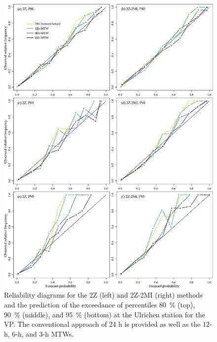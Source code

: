 \documentclass[hess, manuscript]{copernicus}
\begin{document}
	\begin{figure}[htb]
		\begin{center}
			\includegraphics[width=14cm]{fig12.pdf}
		\end{center}
		\caption{Reliability diagrams for the 2Z (left) and 2Z-2MI (right) methods and the prediction of the exceedance of percentiles 80~\% (top), 90~\% (middle), and 95~\% (bottom) at the Ulrichen station for the VP. The conventional approach of 24 h is provided as well as the 12-h, 6-h, and 3-h MTWs.}
		\label{fig:reliability_diagrams}
	\end{figure}
\end{document}
